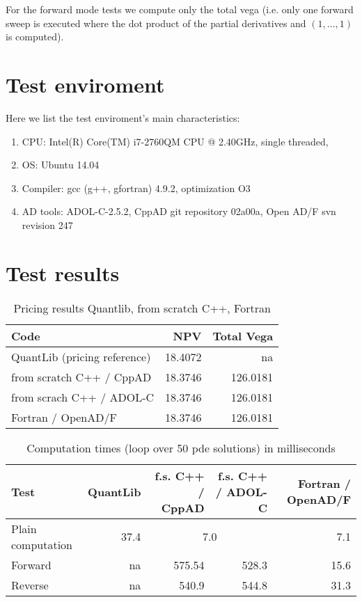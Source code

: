 \documentclass{amsart}
\theoremstyle{plain}
\numberwithin{equation}{section}
\begin{document}
For the forward mode tests we compute only the total vega (i.e. only one forward sweep is executed where the dot product of the partial derivatives and $(1,\dots,1)$ is computed).

\section{Test enviroment}

Here we list the test enviroment's main characteristics:

\begin{enumerate}
\item CPU: Intel(R) Core(TM) i7-2760QM CPU @ 2.40GHz, single threaded,
\item OS: Ubuntu 14.04
\item Compiler: gcc (g++, gfortran) 4.9.2, optimization O3
\item AD tools: ADOL-C-2.5.2, CppAD git repository 02a00a, Open AD/F svn revision 247
\end{enumerate}

\section{Test results}

\begin{table}[ht]
\begin{tabular}{l | r | r}
Code & NPV & Total Vega \\ \hline
QuantLib (pricing reference) & 18.4072 & na \\
from scratch C++ / CppAD & 18.3746 & 126.0181 \\
from scrach C++ / ADOL-C & 18.3746 & 126.0181   \\
Fortran / OpenAD/F & 18.3746 & 126.0181 \\
\end{tabular}
\caption{Pricing results Quantlib, from scratch C++, Fortran}
\end{table}

\begin{table}[ht]
\caption{Computation times (loop over 50 pde solutions) in milliseconds}
\begin{tabular}{l | r | r | r | r}
Test & QuantLib & f.s. C++ / CppAD & f.s. C++ / ADOL-C & Fortran / OpenAD/F \\ \hline
Plain computation & 37.4 & \multicolumn{2}{c|}{7.0} &  7.1 \\ \hline
Forward & na & 575.54 & 528.3 & 15.6 \\
Reverse & na & 540.9 & 544.8 & 31.3
\end{tabular}
\label{computationTimes}
\end{table}
\end{document}
